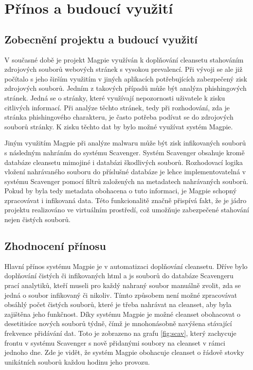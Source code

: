 \documentclass[thesis=M,czech,hidelinks]{FITthesis}[2013/05/06]
\begin{document}
\chapter{Přínos a budoucí využití}
\section{Zobecnění projektu a budoucí využití}
V současné době je projekt Magpie využíván k doplňování cleansetu stahováním zdrojových souborů webových stránek s vysokou prevalencí. Při vývoji se ale již počítalo s jeho širším využitím v jiných aplikacích potřebujících zabezpečený zisk zdrojových souborů. Jedním z takových případů může být analýza phishingových stránek. Jedná se o stránky, které využívají nepozornosti uživatele k zisku citlivých informací. Při analýze těchto stránek, tedy při rozhodování, zda je stránka phishingového charakteru, je často potřeba podívat se do zdrojových souborů stránky. K zisku těchto dat by bylo možné využívat systém Magpie. 

Jiným využitím Magpie při analýze malwaru může být zisk infikovaných souborů s následným nahráním do systému Scavenger. Systém Scavenger obsahuje kromě databáze cleansetu mimojiné i databázi škodlivých souborů. Rozhodovací logika vložení nahrávaného souboru do příslušné databáze je lehce implementovatelná v systému Scavenger pomocí filtrů založených na metadatech nahrávaných souborů. Pokud by byla tedy metadata obohacena o tuto informaci, je Magpie schopný zpracovávat i infikovaná data. Této funkcionalitě značně přispívá fakt, že je jádro projektu realizováno ve virtuálním prostředí, což umožňuje zabezpečené stahování nejen čistých souborů.



\section{Zhodnocení přínosu}
Hlavní přínos systému Magpie je v automatizaci doplňování cleansetu. Dříve bylo doplňování čistých či infikovaných html a js souborů do databáze Scavengeru prací analytiků, kteří museli pro každý nahraný soubor manuálně zvolit, zda se jedná o soubor infikovaný či nikoliv. Tímto způsobem není možné zpracovávat obsáhlý počet čistých souborů, které je třeba nahrávat na cleanset, aby byla zajištěna jeho funkčnost. Díky systému Magpie je možné cleanset obohacovat o desetitisíce nových souborů týdně, čímž je mnohonásobně navýšena stávající frekvence přidávání dat. Toto je zobrazeno na grafu \ref{fig:scav}, který zachycuje frontu v systému Scavenger s nově přidanými soubory na cleanset v rámci jednoho dne. Zde je vidět, že systém Magpie obohacuje cleanset o řádově stovky unikátních souborů každou hodinu jeho provozu. 
\end{document}
